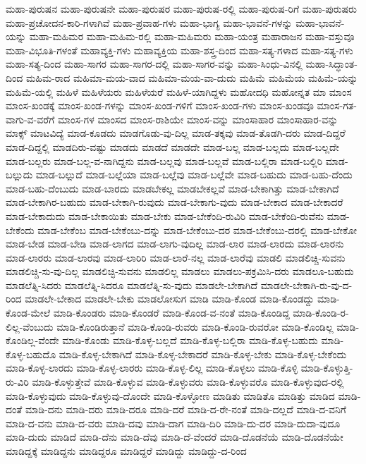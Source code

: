 {ಮಹಾ-ಪುರುಷನ
ಮಹಾ-ಪುರುಷನೇ
ಮಹಾ-ಪುರುಷರ
ಮಹಾ-ಪುರುಷ-ರಲ್ಲಿ
ಮಹಾ-ಪುರುಷ-ರಿಗೆ
ಮಹಾ-ಪುರುಷರು
ಮಹಾ-ಪ್ರಚೋದನ-ಕಾರಿ-ಗಳಾಗಿವೆ
ಮಹಾ-ಪ್ರವಾಹ-ಗಳು
ಮಹಾ-ಭಾಗ್ಯ
ಮಹಾ-ಭಾವನೆ-ಗಳನ್ನು
ಮಹಾ-ಭಾವನೆ-ಯನ್ನು
ಮಹಾ-ಮಹಿಮರ
ಮಹಾ-ಮಹಿಮ-ರಲ್ಲಿ
ಮಹಾ-ಮಹಿಮರು
ಮಹಾ-ಯಂತ್ರ
ಮಹಾರಾಜನ
ಮಹಾ-ವಸ್ತುವೂ
ಮಹಾ-ವಿಭೂತಿ-ಗಳಂತೆ
ಮಹಾವ್ಯಕ್ತಿ-ಗಳು
ಮಹಾವ್ಯಕ್ತಿಯ
ಮಹಾ-ಶಸ್ತ್ರ-ದಿಂದ
ಮಹಾ-ಸತ್ಯ-ಗಳಾದ
ಮಹಾ-ಸತ್ಯ-ಗಳು
ಮಹಾ-ಸತ್ಯ-ದಿಂದ
ಮಹಾ-ಸಾಗರ
ಮಹಾ-ಸಾಗರ-ದಲ್ಲಿ
ಮಹಾ-ಸಾಗರ-ವನ್ನು
ಮಹಾ-ಸಿಂಧು-ವಿನಲ್ಲಿ
ಮಹಾ-ಸಿದ್ಧಾಂತ-ದಿಂದ
ಮಹಿಮ-ರಾದ
ಮಹಿಮಾ-ಮಯ-ವಾದ
ಮಹಿಮಾ-ಮಯ-ವಾ-ದುದು
ಮಹಿಮೆ
ಮಹಿಮೆಯ
ಮಹಿಮೆ-ಯನ್ನು
ಮಹಿಮೆ-ಯಲ್ಲಿ
ಮಹಿಳೆ
ಮಹಿಳೆಯರು
ಮಹಿಳೆಯರೆ
ಮಹಿಳೆ-ಯಾಗಿದ್ದಳು
ಮಹೋದಧಿ
ಮಹೋನ್ನತ
ಮಾ
ಮಾಂಸ
ಮಾಂಸ-ಖಂಡಕ್ಕೆ
ಮಾಂಸ-ಖಂಡ-ಗಳನ್ನು
ಮಾಂಸ-ಖಂಡ-ಗಳಿಗೆ
ಮಾಂಸ-ಖಂಡ-ಗಳು
ಮಾಂಸ-ಖಂಡವೂ
ಮಾಂಸ-ಗತ-ವಾಗು-ವ-ವರೆಗೆ
ಮಾಂಸ-ಗಳ
ಮಾಂಸದ
ಮಾಂಸ-ರಾಶಿಯೇ
ಮಾಂಸ-ವನ್ನು
ಮಾಂಸಾಹಾರ
ಮಾಂಸಾಹಾರ-ವನ್ನು
ಮಾಕ್ಸ್
ಮಾಟವಿದ್ಯೆ
ಮಾಡ-ಕೂಡದು
ಮಾಡಗೊಡು-ವು-ದಿಲ್ಲ
ಮಾಡ-ತಕ್ಕವು
ಮಾಡ-ತೊಡಗಿ-ದರು
ಮಾಡ-ದಿದ್ದರೆ
ಮಾಡ-ದಿದ್ದಲ್ಲಿ
ಮಾಡದಿರು-ವಷ್ಟು
ಮಾಡದು
ಮಾಡದೆ
ಮಾಡದೇ
ಮಾಡ-ಬಲ್ಲ
ಮಾಡ-ಬಲ್ಲದು
ಮಾಡ-ಬಲ್ಲದೇ
ಮಾಡ-ಬಲ್ಲರು
ಮಾಡ-ಬಲ್ಲ-ವ-ನಾಗಿದ್ದನು
ಮಾಡ-ಬಲ್ಲವು
ಮಾಡ-ಬಲ್ಲವೆ
ಮಾಡ-ಬಲ್ಲಿರಾ
ಮಾಡ-ಬಲ್ಲಿರಿ
ಮಾಡ-ಬಲ್ಲುದು
ಮಾಡ-ಬಲ್ಲುದೆ
ಮಾಡ-ಬಲ್ಲೆಯಾ
ಮಾಡ-ಬಲ್ಲೆವು
ಮಾಡ-ಬಲ್ಲೆವೇ
ಮಾಡ-ಬಹುದು
ಮಾಡ-ಬಹು-ದೆಂದು
ಮಾಡ-ಬಹು-ದೆಂಬುದು
ಮಾಡ-ಬಾರದು
ಮಾಡಬೇಕಲ್ಲ
ಮಾಡಬೇಕಲ್ಲವೆ
ಮಾಡ-ಬೇಕಾಗಿತ್ತು
ಮಾಡ-ಬೇಕಾಗಿದೆ
ಮಾಡ-ಬೇಕಾಗಿರ-ಬಹುದು
ಮಾಡ-ಬೇಕಾಗಿ-ರುವುದು
ಮಾಡ-ಬೇಕಾಗು-ವುದು
ಮಾಡ-ಬೇಕಾದ
ಮಾಡ-ಬೇಕಾದರೆ
ಮಾಡ-ಬೇಕಾದುದು
ಮಾಡ-ಬೇಕಾಯಿತು
ಮಾಡ-ಬೇಕು
ಮಾಡ-ಬೇಕೆಂದಿ-ರುವಿರಿ
ಮಾಡ-ಬೇಕೆಂದಿ-ರುವೆನು
ಮಾಡ-ಬೇಕೆಂದು
ಮಾಡ-ಬೇಕೆಂಬ
ಮಾಡ-ಬೇಕೆಂಬು-ದನ್ನು
ಮಾಡ-ಬೇಕೆಂಬು-ದರ
ಮಾಡ-ಬೇಕೆಂಬು-ದರಲ್ಲಿ
ಮಾಡ-ಬೇಕೋ
ಮಾಡ-ಬೇಡ
ಮಾಡ-ಬೇಡಿ
ಮಾಡ-ಲಾಗದ
ಮಾಡ-ಲಾಗು-ವುದಿಲ್ಲ
ಮಾಡ-ಲಾರ
ಮಾಡ-ಲಾರದು
ಮಾಡ-ಲಾರನು
ಮಾಡ-ಲಾರರು
ಮಾಡ-ಲಾರವು
ಮಾಡ-ಲಾರಿರಿ
ಮಾಡ-ಲಾರೆ-ನಲ್ಲ
ಮಾಡ-ಲಾರೆವು
ಮಾಡಲಿ
ಮಾಡಲಿಚ್ಚಿ-ಸುವನು
ಮಾಡಲಿಚ್ಚಿ-ಸು-ವು-ದಿಲ್ಲ
ಮಾಡಲಿಚ್ಛಿ-ಸುವನು
ಮಾಡಲಿಲ್ಲ
ಮಾಡಲು
ಮಾಡಲು-ಪಕ್ರಮಿಸಿ-ದರು
ಮಾಡಲೂ-ಬಹುದು
ಮಾಡಲೆತ್ನಿ-ಸಿದರು
ಮಾಡಲೆತ್ನಿ-ಸಿದರೂ
ಮಾಡಲೆತ್ನಿ-ಸು-ವುದು
ಮಾಡಲೇ-ಬೇಕಾಗಿದೆ
ಮಾಡಲೇ-ಬೇಕಾಗಿ-ರು-ವು-ದ-ರಿಂದ
ಮಾಡಲೇ-ಬೇಕಾದ
ಮಾಡಲೇ-ಬೇಕು
ಮಾಡಲೋಸುಗ
ಮಾಡಿ
ಮಾಡಿ-ಕೊಂಡ
ಮಾಡಿ-ಕೊಂಡದ್ದು
ಮಾಡಿ-ಕೊಂಡ-ಮೇಲೆ
ಮಾಡಿ-ಕೊಂಡರು
ಮಾಡಿ-ಕೊಂಡರೆ
ಮಾಡಿ-ಕೊಂಡ-ವ-ನಂತೆ
ಮಾಡಿ-ಕೊಂಡಿದ್ದ
ಮಾಡಿ-ಕೊಂಡಿ-ರ-ಲಿಲ್ಲ-ವೆಂಬುದು
ಮಾಡಿ-ಕೊಂಡಿರುತ್ತಾನೆ
ಮಾಡಿ-ಕೊಂಡಿ-ರುವರು
ಮಾಡಿ-ಕೊಂಡಿ-ರುವರೋ
ಮಾಡಿ-ಕೊಂಡಿಲ್ಲ
ಮಾಡಿ-ಕೊಂಡಿಲ್ಲ-ವೆಂದೇ
ಮಾಡಿ-ಕೊಂಡು
ಮಾಡಿ-ಕೊಳ್ಳ-ಬಲ್ಲದೆ
ಮಾಡಿ-ಕೊಳ್ಳ-ಬಲ್ಲಿರಾ
ಮಾಡಿ-ಕೊಳ್ಳ-ಬಹುದು
ಮಾಡಿ-ಕೊಳ್ಳ-ಬಹುದೊ
ಮಾಡಿ-ಕೊಳ್ಳ-ಬೇಕಾಗಿದೆ
ಮಾಡಿ-ಕೊಳ್ಳ-ಬೇಕಾದರೆ
ಮಾಡಿ-ಕೊಳ್ಳ-ಬೇಕು
ಮಾಡಿ-ಕೊಳ್ಳ-ಬೇಕೆಂದು
ಮಾಡಿ-ಕೊಳ್ಳ-ಲಾರದು
ಮಾಡಿ-ಕೊಳ್ಳ-ಲಾರರು
ಮಾಡಿ-ಕೊಳ್ಳ-ಲಿಲ್ಲ
ಮಾಡಿ-ಕೊಳ್ಳಲು
ಮಾಡಿ-ಕೊಳ್ಳಿ
ಮಾಡಿ-ಕೊಳ್ಳುತ್ತಿ-ರು-ವಿರಿ
ಮಾಡಿ-ಕೊಳ್ಳುತ್ತೇವೆ
ಮಾಡಿ-ಕೊಳ್ಳುವ
ಮಾಡಿ-ಕೊಳ್ಳುವರು
ಮಾಡಿ-ಕೊಳ್ಳುವರೊ
ಮಾಡಿ-ಕೊಳ್ಳುವುದ-ರಲ್ಲಿ
ಮಾಡಿ-ಕೊಳ್ಳುವುದು
ಮಾಡಿ-ಕೊಳ್ಳುವು-ದೊಂದೇ
ಮಾಡಿ-ಕೊಳ್ಳೋಣ
ಮಾಡಿತು
ಮಾಡಿತೊ
ಮಾಡಿತ್ತು
ಮಾಡಿದ
ಮಾಡಿ-ದಂತೆ
ಮಾಡಿ-ದನು
ಮಾಡಿ-ದರು
ಮಾಡಿ-ದರೂ
ಮಾಡಿ-ದರೆ
ಮಾಡಿ-ದ-ರೇ-ನಂತೆ
ಮಾಡಿ-ದಲ್ಲದೆ
ಮಾಡಿ-ದ-ವನಿಗೆ
ಮಾಡಿ-ದ-ವನು
ಮಾಡಿ-ದ-ವರು
ಮಾಡಿ-ದವು
ಮಾಡಿ-ದಾಗ
ಮಾಡಿ-ದಿರಿ
ಮಾಡಿ-ದು-ದರ
ಮಾಡಿ-ದುದಾ-ವುದೂ
ಮಾಡಿ-ದುದು
ಮಾಡಿದೆ
ಮಾಡಿ-ದೆನು
ಮಾಡಿ-ದೆವು
ಮಾಡಿ-ದೆ-ವೆಂದರೆ
ಮಾಡಿ-ದೊಡನೆಯೆ
ಮಾಡಿ-ದೊಡನೆಯೇ
ಮಾಡಿದ್ದಕ್ಕೆ
ಮಾಡಿದ್ದನು
ಮಾಡಿದ್ದರೂ
ಮಾಡಿದ್ದರೆ
ಮಾಡಿದ್ದು
ಮಾಡಿದ್ದು-ದ-ರಿಂದ
}
